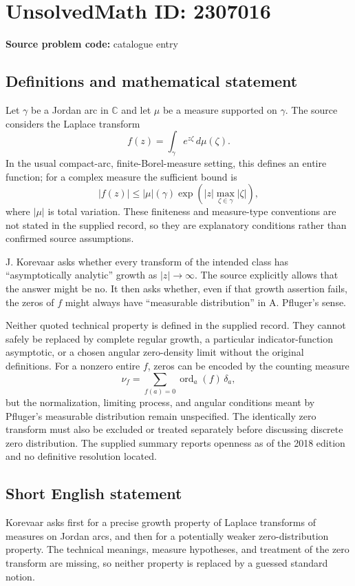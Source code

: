 \documentclass[11pt]{article}
\newcommand{\C}{\mathbb{C}}
\begin{document}
\section*{UnsolvedMath ID: 2307016}
\textbf{Source problem code:} catalogue entry
\subsection{Definitions and mathematical statement}
Let $\gamma$ be a Jordan arc in $\C$ and let $\mu$ be a measure supported on $\gamma$. The source considers the Laplace transform
\[
f(z)=\int_\gamma e^{z\zeta}\,d\mu(\zeta).
\]
In the usual compact-arc, finite-Borel-measure setting, this defines an entire function; for a complex measure the sufficient bound is
\[
|f(z)|\leq |\mu|(\gamma)\exp\!\left(|z|\max_{\zeta\in\gamma}|\zeta|\right),
\]
where $|\mu|$ is total variation. These finiteness and measure-type conventions are not stated in the supplied record, so they are explanatory conditions rather than confirmed source assumptions.

J. Korevaar asks whether every transform of the intended class has ``asymptotically analytic'' growth as $|z|\to\infty$. The source explicitly allows that the answer might be no. It then asks whether, even if that growth assertion fails, the zeros of $f$ might always have ``measurable distribution'' in A. Pfluger's sense.

Neither quoted technical property is defined in the supplied record. They cannot safely be replaced by complete regular growth, a particular indicator-function asymptotic, or a chosen angular zero-density limit without the original definitions. For a nonzero entire $f$, zeros can be encoded by the counting measure
\[
\nu_f=\sum_{f(a)=0}\operatorname{ord}_a(f)\,\delta_a,
\]
but the normalization, limiting process, and angular conditions meant by Pfluger's measurable distribution remain unspecified. The identically zero transform must also be excluded or treated separately before discussing discrete zero distribution. The supplied summary reports openness as of the 2018 edition and no definitive resolution located.
\subsection{Short English statement}
Korevaar asks first for a precise growth property of Laplace transforms of measures on Jordan arcs, and then for a potentially weaker zero-distribution property. The technical meanings, measure hypotheses, and treatment of the zero transform are missing, so neither property is replaced by a guessed standard notion.
\end{document}
